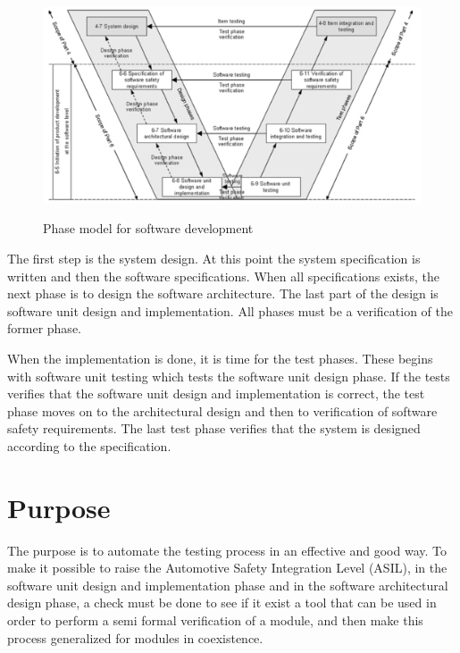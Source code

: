 \begin{figure}[!ht]
  \includegraphics[keepaspectratio, width=\linewidth]{pictures/V}
  \label{IMG:phase_model}
  \caption{Phase model for software development}
\end{figure}

The first step is the system design. At this point the system specification is
written and then the software specifications. When all
specifications exists, the next phase is to design the software architecture.
The last part of the design is software unit design and implementation. All
phases must be a verification of the former phase.

When the implementation is done, it is time for the test phases. These begins
with software unit testing which tests the software unit design phase. If the
tests verifies that the software unit design and implementation is correct, the
test phase moves on to the architectural design and then to verification of
software safety requirements.
The last test phase verifies that the system is
designed according to the specification. %

\section{Purpose}
The purpose is to automate the testing process in an effective and good way.
To make it possible to raise the Automotive Safety Integration Level (ASIL), in
the software unit design and implementation phase and in the software
architectural design phase, a check must be done to see if it exist a tool that
can be used in order to perform a semi formal verification of a module, and
then make this process generalized for modules in coexistence.\\

